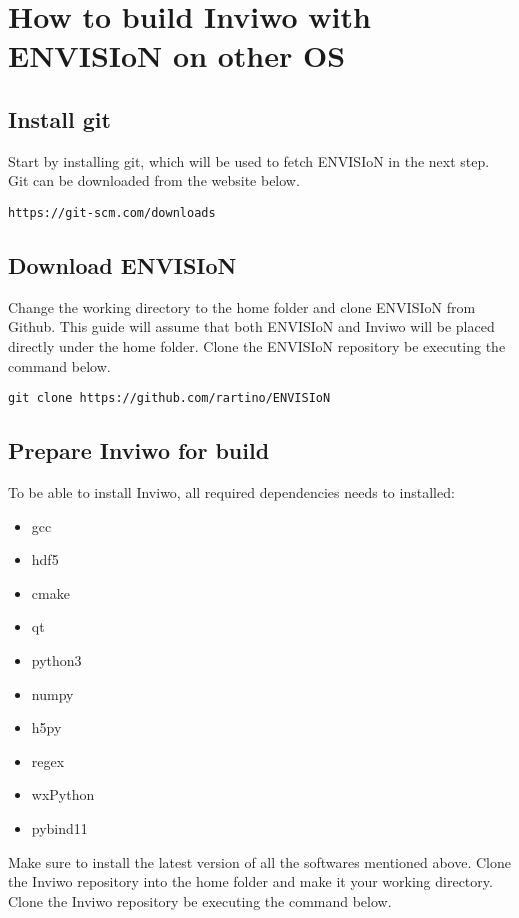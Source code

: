 \section{How to build Inviwo with ENVISIoN on other OS}

\subsection{Install git}
Start by installing git, which will be used to fetch ENVISIoN in the next step. Git can be downloaded from the website below.
\begin{lstlisting}[frame = single, breaklines=true]
    https://git-scm.com/downloads
\end{lstlisting}

\subsection{Download ENVISIoN}
Change the working directory to the home folder and clone ENVISIoN from Github. This guide will assume that both ENVISIoN and Inviwo will be placed directly under the home folder. Clone the ENVISIoN repository be executing the command below.
\begin{lstlisting}[frame = single, breaklines=true]
    git clone https://github.com/rartino/ENVISIoN
\end{lstlisting}

\subsection{Prepare Inviwo for build}
To be able to install Inviwo, all required dependencies needs to installed: 
\begin{itemize}
    \setlength\itemsep{0em}
    \item gcc
    \item hdf5 
    \item cmake
    \item qt
    \item python3
    \item numpy
    \item h5py
    \item regex
    \item wxPython
    \item pybind11
\end{itemize}

Make sure to install the latest version of all the softwares mentioned above. Clone the Inviwo repository into the home folder and make it your working directory. Clone the Inviwo repository be executing the command below.


